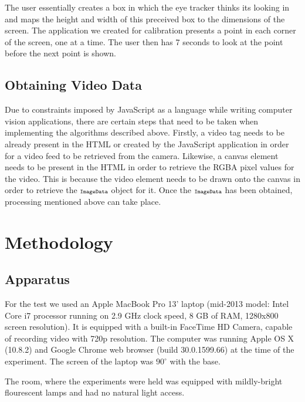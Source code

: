 \documentclass[annual]{acmsiggraph}
\newcommand{\Acronym}[1]{\ensuremath{{\small{\texttt{#1}}}}}
\begin{document}
The user essentially creates a box in which the eye tracker thinks its looking
in and maps the height and width of this preceived box to the dimensions of the
screen. The application we created for calibration presents a point in each
corner of the screen, one at a time. The user then has 7 seconds to look at the
point before the next point is shown.

\subsection{Obtaining Video Data}

%
%
%

Due to constraints imposed by JavaScript as a language while writing computer
vision applications, there are certain steps that need to be taken when
implementing the algorithms described above. Firstly, a video tag needs to be
already present in the HTML or created by the JavaScript application in order
for a video feed to be retrieved from the camera. Likewise, a canvas element
needs to be present in the HTML in order to retrieve the RGBA pixel values for
the video.  This is because the video element needs to be drawn onto the canvas
in order to retrieve the $\Acronym{ImageData}$ object for it. Once the
$\Acronym{ImageData}$ has been obtained, processing mentioned above can take
place.

\section{Methodology}

\subsection{Apparatus}

For the test we used an Apple MacBook Pro 13' laptop (mid-2013 model: Intel
Core i7 processor running on 2.9 GHz clock speed, 8 GB of RAM, 1280x800 screen
resolution).  It is equipped with a built-in FaceTime HD Camera, capable of
recording video with 720p resolution. The computer was running Apple OS X
(10.8.2) and Google Chrome web browser (build 30.0.1599.66) at the time of the
experiment. The screen of the laptop was $90^{\circ}$ with the base.

The room, where the experiments were held was equipped with mildly-bright
flourescent lamps and had no natural light access. 
\end{document}
